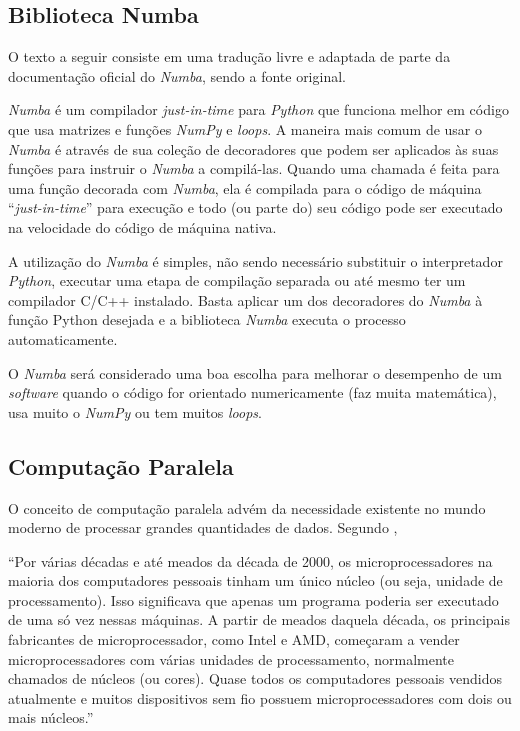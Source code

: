 \documentclass[12pt]{article}
\newcommand{\aspas}[1]{``#1''} %
\newcommand{\citacao}[1]{
	\singlespacing %
	\begin{flushright}
		\begin{minipage}{0.75\linewidth} %
			{\fontsize{10}{\baselineskip}\selectfont \aspas{#1}}
		\end{minipage}
	\end{flushright}
	\onehalfspacing %
}
\begin{document}
\subsection{Biblioteca Numba}
\label{numba}

O texto a seguir consiste em uma tradução livre e adaptada de parte da documentação oficial do \textit{Numba}, sendo \cite{numba:2022} a fonte original.

\textit{Numba} é um compilador \textit{just-in-time} para \textit{Python} que funciona melhor em código que usa matrizes e funções \textit{NumPy} e \textit{loops}. A maneira mais comum de usar o \textit{Numba} é através de sua coleção de decoradores que podem ser aplicados às suas funções para instruir o \textit{Numba} a compilá-las. Quando uma chamada é feita para uma função decorada com \textit{Numba}, ela é compilada para o código de máquina \aspas{\textit{just-in-time}} para execução e todo (ou parte do) seu código pode ser executado na velocidade do código de máquina nativa.

A utilização do \textit{Numba} é simples, não sendo necessário substituir o interpretador \textit{Python}, executar uma etapa de compilação separada ou até mesmo ter um compilador C/C++ instalado. Basta aplicar um dos decoradores do \textit{Numba} à função Python desejada e a biblioteca \textit{Numba} executa o processo automaticamente.

O \textit{Numba} será considerado uma boa escolha para melhorar o desempenho de um \textit{software} quando o código for orientado numericamente (faz muita matemática), usa muito o \textit{NumPy} ou tem muitos \textit{loops}.

\subsection{Computação Paralela}
\label{computacao_paralela}

O conceito de computação paralela advém da necessidade existente no mundo moderno de processar grandes quantidades de dados. Segundo \cite{perkovic:2016}, 

\citacao{Por várias décadas e até meados da década de 2000, os microprocessadores na maioria dos computadores pessoais tinham
	um único núcleo (ou seja, unidade de processamento). Isso significava que apenas um programa poderia ser executado de
	uma só vez nessas máquinas. A partir de meados daquela década, os principais fabricantes de microprocessador, como Intel
	e AMD, começaram a vender microprocessadores com várias unidades de processamento, normalmente chamados
	de núcleos (ou cores). Quase todos os computadores pessoais vendidos atualmente e muitos dispositivos sem fio possuem
	microprocessadores com dois ou mais núcleos.}
\end{document}
